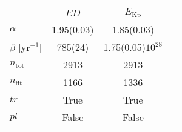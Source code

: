 \begin{tabular}{lccr}
\hline\hline
  &        $ED$ &      $E_\mathrm{Kp}$ \\
\hline
$\alpha$            &  1.95(0.03) &           1.85(0.03) \\
$\beta$ [yr$^{-1}$] &     785(24) &  1.75(0.05)$10^{28}$ \\
$n_\mathrm{tot}$    &        2913 &                 2913 \\
$n_\mathrm{fit}$    &        1166 &                 1336 \\
$tr$                &        True &                 True \\
$pl$                &       False &                False \\
\hline

\end{tabular}
